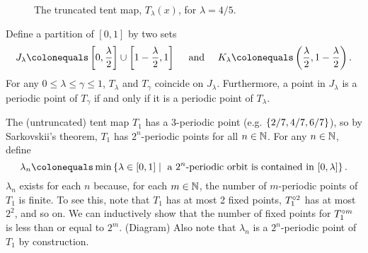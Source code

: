 \documentclass[12pt,twoside,draft]{book}
\begin{document}
\begin{example}
\begin{figure}[th]
    \label{fig:tent-map}
    \caption{The truncated tent map, $T_\lambda(x)$, for $\lambda = 4/5$.}
  \end{figure}
  Define a partition of $[0,1]$ by two sets
  \begin{equation*}
    J_\lambda \ceq \brac{0, \frac{\lambda}{2}} \cup \brac{1 - \frac{\lambda}{2}, 1} 
    \quad\mbox{ and }\quad
    K_\lambda \ceq \paren{\frac{\lambda}{2}, 1- \frac{\lambda}{2}}.
  \end{equation*}
  For any $0 \leq \lambda \leq \gamma \leq 1$, $T_\lambda$ and $T_\gamma$ coincide on $J_\lambda$.
  Furthermore, a point in $J_\lambda$ is a periodic point of $T_\gamma$ if and only if it is a periodic point of $T_\lambda$.

  The (untruncated) tent map $T_1$ has a 3-periodic point (e.g. $\left \{ 2/7, 4/7, 6/7 \right \}$), so by Sarkovskii's theorem, $T_1$ has $2^n$-periodic points for all $n \in \mathbb{N}$.
  For any $n \in \mathbb{N}$, define
  \begin{equation*}
    \lambda_n \ceq \min\setst{\lambda \in [0,1]}{\mbox{ a } 2^n\mbox{-periodic orbit is contained in } [0,\lambda]}.
  \end{equation*}
  $\lambda_n$ exists for each $n$ because, for each $m \in \mathbb{N}$, the number of $m$-periodic points of $T_1$ is finite.
  To see this, note that $T_1$ has at most 2 fixed points, $T_1^{\circ 2}$ has at most $2^2$, and so on. 
  We can inductively show that the number of fixed points for $T_1^{\circ m}$ is less than or equal to $2^m$. (Diagram)
  Also note that $\lambda_n$ is a $2^n$-periodic point of $T_1$ by construction.


\end{example}
\end{document}
